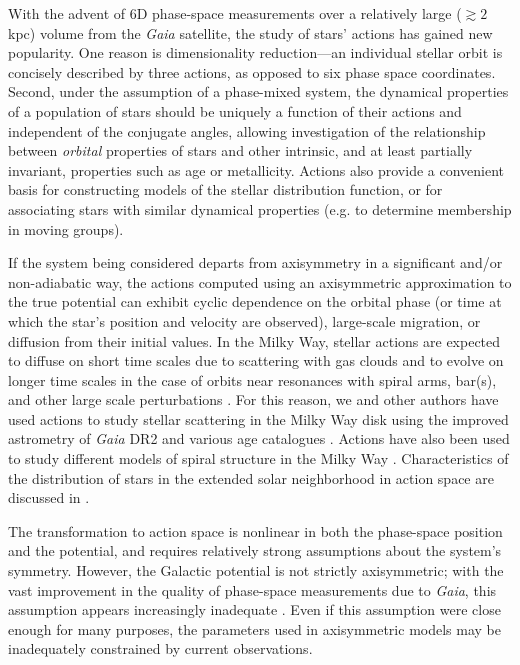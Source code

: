 \documentclass[twocolumn]{aastex62}
\begin{document}
With the advent of 6D phase-space measurements over a relatively large
($\gtrsim 2$ kpc) volume from the {\em Gaia} satellite, the study of stars'
actions has gained new popularity. One reason is dimensionality reduction---an
individual stellar orbit is concisely described by three actions, as opposed
to six phase space coordinates. Second, under the assumption of a phase-mixed
system, the dynamical properties of a population of stars should be uniquely a
function of their actions and independent of the conjugate angles, allowing
investigation of the relationship between {\em orbital} properties of stars
and other intrinsic, and at least partially invariant, properties such as age
or metallicity. Actions also provide a convenient basis for constructing
models of the stellar distribution function, or for associating stars with
similar dynamical properties (e.g. to determine membership in moving groups).

If the system being considered departs from axisymmetry in a significant
and/or non-adiabatic way, the actions computed using an axisymmetric
approximation to the true potential can exhibit cyclic dependence on the
orbital phase (or time at which the star's position and velocity are
observed), large-scale migration, or diffusion from their initial values. In
the Milky Way, stellar actions are expected to diffuse on short time scales
due to scattering with gas clouds and to evolve on longer time scales in the
case of orbits near resonances with spiral arms, bar(s), and other large scale
perturbations \citep{2014RvMP...86....1S}. For this reason, we and other
authors have used actions to study stellar scattering in the Milky Way disk
using the improved astrometry of {\em Gaia} DR2 and various age catalogues
\citep{2018ApJ...867...31B, 2018arXiv180803278T}. Actions have also been used
to study different models of spiral structure in the Milky Way
\citep{2019MNRAS.tmp..155S}. Characteristics of the distribution of stars in
the extended solar neighborhood in action space are discussed in
\citet{2019MNRAS.484.3291T}.

The transformation to action space is nonlinear in both the phase-space
position and the potential, and requires relatively strong assumptions about
the system's symmetry. However, the Galactic potential is not strictly
axisymmetric; with the vast improvement in the quality of phase-space
measurements due to {\em Gaia}, this assumption appears increasingly
inadequate \citep[e.g.][]{2018Natur.561..360A}. Even if this assumption were
close enough for many purposes, the parameters used in axisymmetric models may
be inadequately constrained by current observations.
\end{document}
